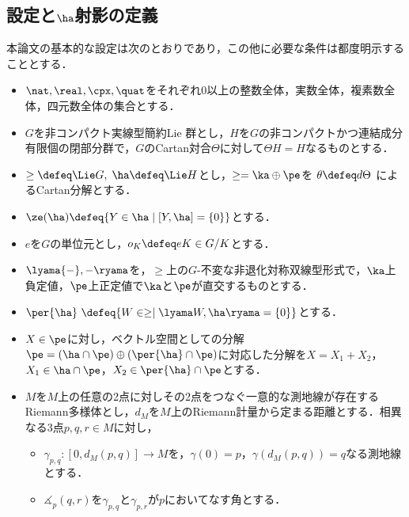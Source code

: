 
\newcommand*\ccircled[4]{\tikz[baseline=(char.base)]{
    \node[shape=circle, fill=#2, draw=#3, text=#4, inner sep=1pt] (char) {#1};}}
\newcommand{\cnum}[1]{\ccircled{#1}{MediumTurquoise!40}{MediumTurquoise!40}{black}}

\subsection{設定と$\ha$射影の定義}
本論文の基本的な設定は次のとおりであり，この他に必要な条件は都度明示することとする．

\begin{nttdef}\label{nttdef:fund}
  \leavevmode\vspace{-1em}
  \begin{itemize}
  \item $\nat,\real, \cpx,\quat$をそれぞれ0以上の整数全体，実数全体，複素数全体，四元数全体の集合とする．
  \item $G$を非コンパクト実線型簡約Lie 群とし，$H$を$G$の非コンパクトかつ連結成分有限個の閉部分群で，$G$のCartan対合$\Theta$に対して$\Theta H = H$なるものとする．

  \item $\ge \defeq \Lie G,\; \ha \defeq \Lie H$とし，$\ge = \ka\oplus \pe$を $\theta \defeq d\Theta$ によるCartan分解とする．
  \item $\ze(\ha)\defeq \{Y\in \ha\mid [Y,\ha] = \{0\} \} $とする．
  \item $e$を$G$の単位元とし，$o_K \defeq eK\in G/K$とする．
  \item $\lyama{-},{-} \ryama$を，$\ge$上の$G$-不変な非退化対称双線型形式で，$\ka$上負定値，$\pe$上正定値で$\ka$と$ \pe$が直交するものとする．
  \item $\per{\ha}\ \defeq \{W\in \ge\mid \lyama W, \ha\ryama = \{0\}\} $とする．
  \item $X\in \pe$に対し，ベクトル空間としての分解$\pe =( \ha\cap \pe)\oplus(\per{\ha}\cap \pe) $に対応した分解を$X = X_1 + X_2 $，$X_1 \in \ha\cap \pe$，$X_2\in \per{\ha}\cap \pe$とする．
  \item $M$を$M$上の任意の2点に対しその2点をつなぐ一意的な測地線が存在するRiemann多様体とし，$d_M $を$M$上のRiemann計量から定まる距離とする．相異なる3点$p,q,r \in M$に対し，
    \begin{itemize}
    \item $\gamma_{p,q}\colon [0, d_{M}(p,q)] \to M$を，$\gamma(0) =  p$，$\gamma(d_{M}(p,q)) = q $なる測地線とする．
    \item $\measuredangle_{p}(q, r)$を$\gamma_{p,q} $と$\gamma_{p,r} $が$p$においてなす角とする．
    \end{itemize}
  \end{itemize}  
\end{nttdef}

